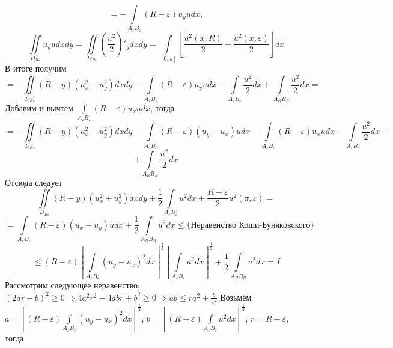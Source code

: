 \documentclass[12pt, a4paper]{article}
\begin{document}
	\begin{equation*}
		= - \int\limits_{A_\varepsilon B_\varepsilon} \left(R - \varepsilon \right) u_yu dx, 
	\end{equation*}
	\begin{equation*}
		\iint\limits_{D_{R\varepsilon}} u_y u dx dy = \iint\limits_{D_{R\varepsilon}} \left(\dfrac{u^2}{2}\right)'_ydx dy = \int\limits_{[0,\pi]} \left[\dfrac{u^2(x,R)}{2} - \dfrac{u^2(x, \varepsilon)}{2}\right] dx 
	\end{equation*}
	\newline
	В итоге получим
	\begin{equation*}
		= - \iint\limits_{D_{R\varepsilon}} \left(R - y\right) \left(u_x^2 + u_y^2\right) dx dy
		- \int\limits_{A_\varepsilon B_\varepsilon} \left(R - \varepsilon\right) u_y u dx 
		-\int\limits_{A_\varepsilon B_\varepsilon} \dfrac{u^2}{2} dx + \int\limits_{A_R B_R} \dfrac{u^2}{2} dx = 
	\end{equation*}
	Добавим и вычтем $\int\limits_{A_\varepsilon B_\varepsilon} \left(R - \varepsilon\right) u_x u dx$, тогда
	\begin{equation*}
		= - \iint\limits_{D_{R\varepsilon}} \left(R - y\right) \left(u_x^2 + u_y^2\right) dx dy - 
		\int\limits_{A_\varepsilon B_\varepsilon} \left(R - \varepsilon \right) \left(u_y - u_x\right)u dx - \int\limits_{A_\varepsilon B_\varepsilon} \left(R - \varepsilon\right) u_x u dx - \int\limits_{A_\varepsilon B_\varepsilon}\dfrac{u^2}{2} dx +
	\end{equation*}
	\begin{equation*}
		+ \int\limits_{A_R B_R} \dfrac{u^2}{2}dx
	\end{equation*}
	Отсюда следует
	\begin{equation*}
		\iint\limits_{D_{R\varepsilon}} \left(R - y\right) \left(u_x^2 + u_y^2\right) dx dy + \dfrac{1}{2}\int\limits_{A_\varepsilon B_\varepsilon} u^2 dx +\dfrac{R - \varepsilon}{2}u^2(\pi, \varepsilon)  =
	\end{equation*}
	\begin{equation*}
		= \int\limits_{A_\varepsilon B_\varepsilon} \left(R - \varepsilon \right) \left(u_x - u_y\right)u dx + \dfrac12  \int\limits_{A_R B_R} u^2 dx \leq \{ \text{Неравенство Коши-Буняковского} \}
	\end{equation*}
	\begin{equation*}
		\leq \left(R - \varepsilon\right) \left[\int\limits_{A_\varepsilon B_\varepsilon} \left( u_y - u_x\right)^2 dx \right]^{\frac12} \left[\int\limits_{A_\varepsilon B_\varepsilon} u^2 dx \right]^{\frac12} + \dfrac12 \int\limits_{A_RB_R} u^2 dx = I
	\end{equation*}
	Рассмотрим следующее неравенство: \begin{math}
		\left(2ar -b\right)^2 \geq 0 \Rightarrow 4a^2 r^2 - 4 abr + b^2 \geq 0 \Rightarrow ab \leq r a^2 + \frac{b}{4r}
	\end{math}
	\newline
	Возьмём $ a = \left[ \left(R - \varepsilon \right) \int\limits_{A_\varepsilon B_\varepsilon} \left( u_y - u_x\right)^2 dx \right]^{\frac12}$, $ b = \left[\left(R - \varepsilon\right)\int\limits_{A_\varepsilon B_\varepsilon} u^2 dx \right]^{\frac12}$, $ r = R - \varepsilon$, тогда
	
\end{document}

